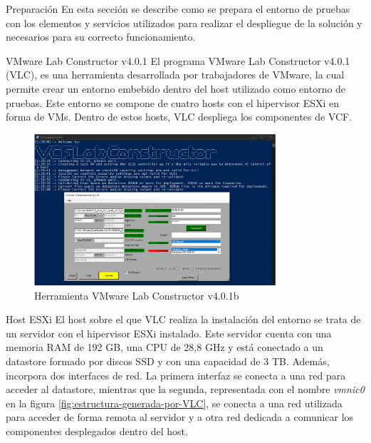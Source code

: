 \begin{subsection}{Preparación}
  En esta sección se describe como se prepara el entorno de pruebas con los elementos y servicios utilizados para realizar el despliegue de la solución y necesarios para su correcto funcionamiento.

  \begin{subsubsection}{VMware Lab Constructor v4.0.1}
    El programa VMware Lab Constructor v4.0.1 (VLC), es una herramienta desarrollada por trabajadores de VMware, la cual permite crear un entorno embebido dentro del host utilizado como entorno de pruebas. Este entorno se compone de cuatro hosts con el hipervisor ESXi en forma de VMs. Dentro de estos hosts, VLC despliega los componentes de VCF.

    \begin{figure}[h!]
      \centering
      \includegraphics[width=0.8\textwidth]{imaxes/pruebaconcepto/VLC.png}
      \caption{Herramienta VMware Lab Constructor v4.0.1b}
      \label{fig:VLC}
    \end{figure}
    \FloatBarrier

  \end{subsubsection}

  \begin{subsubsection}{Host ESXi}  
    El host sobre el que VLC realiza la instalación del entorno se trata de un servidor con el hipervisor ESXi instalado. Este servidor cuenta con una memoria RAM de 192 GB, una CPU de 28,8 GHz y está conectado a un datastore formado por discos SSD y con una capacidad de 3 TB. Además, incorpora dos interfaces de red. La primera interfaz se conecta a una red para acceder al datastore, mientras que la segunda, representada con el nombre \textit{vmnic0} en la figura \ref{fig:estructura-generada-por-VLC}, se conecta a una red utilizada para acceder de forma remota al servidor y a otra red dedicada a comunicar los componentes desplegados dentro del host.


\end{subsubsection}
\end{subsection}
